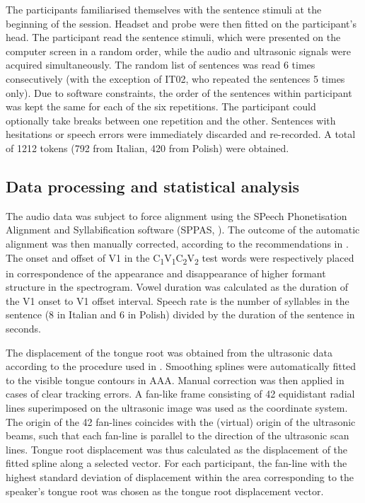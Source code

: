 \documentclass[12pt,]{article}
\begin{document}
The participants familiarised themselves with the sentence stimuli at
the beginning of the session. Headset and probe were then fitted on the
participant's head. The participant read the sentence stimuli, which
were presented on the computer screen in a random order, while the audio
and ultrasonic signals were acquired simultaneously. The random list of
sentences was read 6 times consecutively (with the exception of IT02,
who repeated the sentences 5 times only). Due to software constraints,
the order of the sentences within participant was kept the same for each
of the six repetitions. The participant could optionally take breaks
between one repetition and the other. Sentences with hesitations or
speech errors were immediately discarded and re-recorded. A total of
1212 tokens (792 from Italian, 420 from Polish) were obtained.

\hypertarget{data-processing-and-statistical-analysis}{%
\subsection{Data processing and statistical
analysis}\label{data-processing-and-statistical-analysis}}

\label{s:process}

The audio data was subject to force alignment using the SPeech
Phonetisation Alignment and Syllabification software (SPPAS,
\citealt{bigi2015}). The outcome of the automatic alignment was then
manually corrected, according to the recommendations in
\citet{machac2009}. The onset and offset of V1 in the
C\textsubscript{1}V\textsubscript{1}C\textsubscript{2}V\textsubscript{2}
test words were respectively placed in correspondence of the appearance
and disappearance of higher formant structure in the spectrogram. Vowel
duration was calculated as the duration of the V1 onset to V1 offset
interval. Speech rate is the number of syllables in the sentence (8 in
Italian and 6 in Polish) divided by the duration of the sentence in
seconds.

The displacement of the tongue root was obtained from the ultrasonic
data according to the procedure used in \citet{kirkham2017}. Smoothing
splines were automatically fitted to the visible tongue contours in AAA.
Manual correction was then applied in cases of clear tracking errors. A
fan-like frame consisting of 42 equidistant radial lines superimposed on
the ultrasonic image was used as the coordinate system. The origin of
the 42 fan-lines coincides with the (virtual) origin of the ultrasonic
beams, such that each fan-line is parallel to the direction of the
ultrasonic scan lines. Tongue root displacement was thus calculated as
the displacement of the fitted spline along a selected vector. For each
participant, the fan-line with the highest standard deviation of
displacement within the area corresponding to the speaker's tongue root
was chosen as the tongue root displacement vector.
\end{document}
